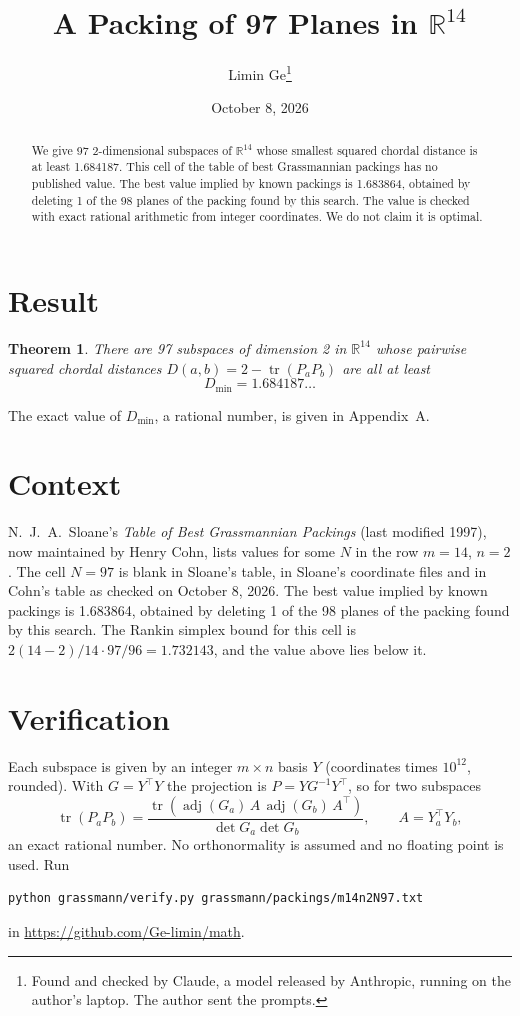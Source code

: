 \documentclass[11pt,a4paper]{article}
\title{A Packing of 97 Planes in $\mathbb{R}^{14}$}
\author{Limin Ge\thanks{Found and checked by Claude, a model released by Anthropic, running on the author's laptop. The author sent the prompts.}}
\date{October 8, 2026}
\newtheorem*{theorem}{Theorem}
\begin{document}
\maketitle
\begin{abstract}
We give 97 2-dimensional subspaces of $\mathbb{R}^{14}$ whose smallest squared chordal distance is at least 1.684187. This cell of the table of best Grassmannian packings has no published value. The best value implied by known packings is 1.683864, obtained by deleting 1 of the 98 planes of the packing found by this search. The value is checked with exact rational arithmetic from integer coordinates. We do not claim it is optimal.
\end{abstract}

\section{Result}
\begin{theorem}
There are 97 subspaces of dimension 2 in $\mathbb{R}^{14}$ whose pairwise squared chordal distances $D(a,b) = 2 - \operatorname{tr}(P_aP_b)$ are all at least
\[ D_{\min} = 1.684187\ldots \]
\end{theorem}
The exact value of $D_{\min}$, a rational number, is given in Appendix~A.


\section{Context}
N.~J.~A.~Sloane's \emph{Table of Best Grassmannian Packings} (last modified 1997), now maintained by Henry Cohn, lists values for some $N$ in the row $m=14$, $n=2$. The cell $N=97$ is blank in Sloane's table, in Sloane's coordinate files and in Cohn's table as checked on October 8, 2026. The best value implied by known packings is 1.683864, obtained by deleting 1 of the 98 planes of the packing found by this search. The Rankin simplex bound for this cell is $2(14-2)/14\cdot 97/96 = 1.732143$, and the value above lies below it.


\section{Verification}
Each subspace is given by an integer $m\times n$ basis $Y$ (coordinates times $10^{12}$, rounded). With $G=Y^\top Y$ the projection is $P=YG^{-1}Y^\top$, so for two subspaces
\[ \operatorname{tr}(P_aP_b)=\frac{\operatorname{tr}(\operatorname{adj}(G_a)\,A\,\operatorname{adj}(G_b)\,A^\top)}{\det G_a\det G_b},\qquad A=Y_a^\top Y_b, \]
an exact rational number. No orthonormality is assumed and no floating point is used. Run
\begin{verbatim}
python grassmann/verify.py grassmann/packings/m14n2N97.txt
\end{verbatim}
in \url{https://github.com/Ge-limin/math}.
\end{document}
